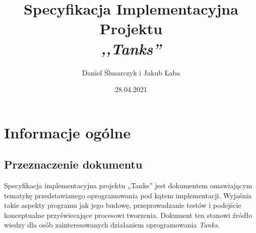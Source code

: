 \documentclass[11pt,a4paper]{report}
\title{\Huge Specyfikacja Implementacyjna  Projektu\\\textsl{,,Tanks''}}
\author{Daniel Ślusarczyk i Jakub Łaba}
\date{28.04.2021}
\begin{document}
\maketitle

\renewcommand*\thesection{\arabic{section}} 


\pagestyle{fancy}
\fancyhf{}
\setcounter{page}{0}

{
\fancyhead{} 
\fancyfoot{} 
}
\thispagestyle{empty} 
\tableofcontents 
\thispagestyle{empty}
\newpage

{
\fancyhead{} 
\fancyfoot[C]{\thepage}
}


\section{Informacje ogólne}\label{sec:tekst}
\subsection {Przeznaczenie dokumentu}
Specyfikacja implementacyjna projektu „Tanks” jest dokumentem omawiającym tematykę przedstawianego oprogramowania pod kątem implementacji. Wyjaśnia takie aspekty programu jak jego budowę, przeprowadzanie testów i podejście konceptualne przyświecające procesowi tworzenia. Dokument ten stanowi źródło wiedzy dla osób zainteresowanych działaniem oprogramowania \textsl{Tanks}.
\end{document}
